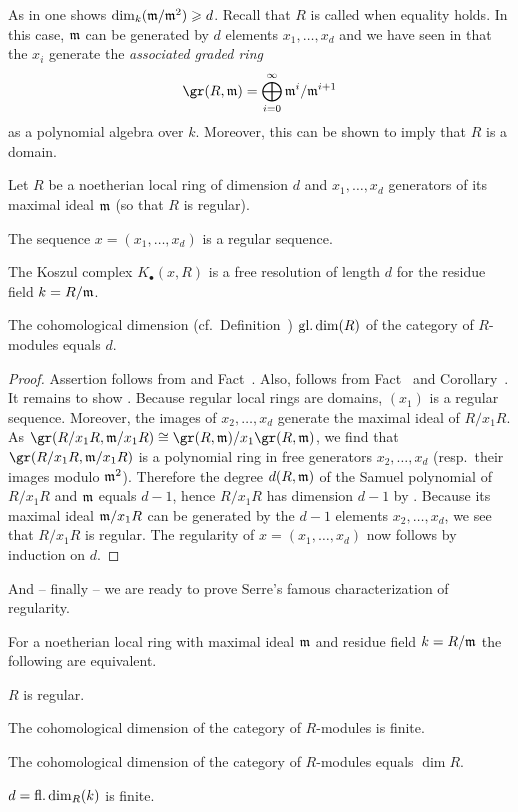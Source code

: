 \documentclass[a4paper,parskip=half,numbers=enddot, DIV=12]{scrreprt}
\renewcommand{\geq}{\geqslant}
\begin{document}
As in \cite[Proposition~1.3.1]{alg2} one shows $\dim_k(\mm/\mm^2)\geq d$. Recall that $R$ is called  when equality holds. In this case, $\mathfrak{m}$ can be generated by $d$ elements $x_1,\ldots,x_d$ and we have seen in \cite[Corollary~3.4.9]{alg2} that the $x_i$ generate the \emph{associated graded ring}
\begin{align*}
	\gr(R,\mm)=\bigoplus_{i=0}^\infty\mm^i/\mm^{i+1}
\end{align*}
as a polynomial algebra over $k$. Moreover, this can be shown to imply that $R$ is a domain.
\begin{prop}
	Let $R$ be a noetherian local ring of dimension $d$ and $x_1,\ldots,x_d$ generators of its maximal ideal $\mathfrak{m}$ (so that $R$ is regular).
	\begin{alphanumerate}
		\item The sequence $x=(x_1,\ldots,x_d)$ is a regular sequence.
		\item The Koszul complex $K_\bullet(x,R)$ is a free resolution of length $d$ for the residue field $k=R/\mathfrak{m}$.
		\item The cohomological dimension (cf.\ Definition~) $\operatorname{gl.dim}(R)$ of the category of $R$-modules equals $d$.
	\end{alphanumerate}
\end{prop}
\begin{proof}
	Assertion  follows from  and Fact~. Also,  follows from Fact~ and Corollary~. It remains to show . Because regular local rings are domains, $(x_1)$ is a regular sequence. Moreover, the images of $x_2,\ldots,x_d$ generate the maximal ideal of $R/x_1R$. As $\gr(R/x_1R,\mm/x_1R)\cong \gr(R,\mm)/x_1\gr(R,\mm)$, we find that $\gr(R/x_1R,\mm/x_1R)$ is a polynomial ring in free generators $x_2,\ldots,x_d$ (resp.\ their images modulo $\mathfrak{m}^2$). Therefore the degree $d(R,\mathfrak{m})$ of the Samuel polynomial of $R/x_1R$ and $\mathfrak{m}$ equals $d-1$, hence $R/x_1R$ has dimension $d-1$ by \cite[Theorem~20]{alg2}. Because its maximal ideal $\mathfrak{m}/x_1R$ can be generated by the $d-1$ elements $x_2,\ldots,x_d$, we see that $R/x_1R$ is regular. The regularity of $x=(x_1,\ldots,x_d)$ now follows by induction on $d$.
\end{proof}
And -- finally -- we are ready to prove Serre's famous characterization of regularity.
\begin{thm}[Serre]
	For a noetherian local ring with maximal ideal $\mathfrak{m}$ and residue field $k=R/\mathfrak{m}$ the following are equivalent.
	\begin{alphanumerate}
		\item $R$ is regular.
		\item The cohomological dimension of the category of $R$-modules is finite.
		\item The cohomological dimension of the category of $R$-modules equals $\dim R$.
		\item $d=\operatorname{fl.dim}_R(k)$ is finite.
	\end{alphanumerate}
\end{thm}
\end{document}
